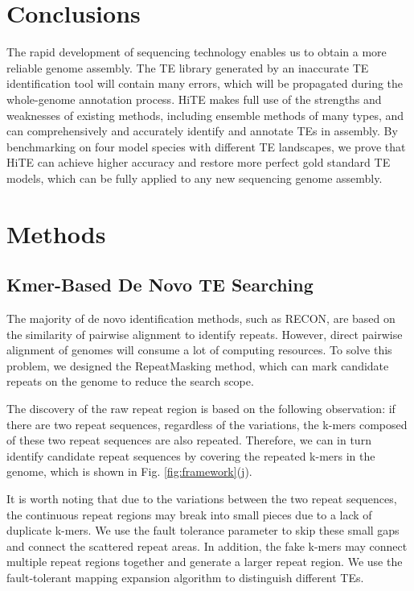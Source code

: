 \documentclass{bmcart}
\begin{document}
\section*{Conclusions}
The rapid development of sequencing technology enables us to obtain a more reliable genome assembly. The TE library generated by an inaccurate TE identification tool will contain many errors, which will be propagated during the whole-genome annotation process. HiTE makes full use of the strengths and weaknesses of existing methods, including ensemble methods of many types, and can comprehensively and accurately identify and annotate TEs in assembly. By benchmarking on four model species with different TE landscapes, we prove that HiTE can achieve higher accuracy and restore more perfect gold standard TE models, which can be fully applied to any new sequencing genome assembly.

\section*{Methods}

\subsection*{Kmer-Based De Novo TE Searching}
The majority of de novo identification methods, such as RECON, are based on the similarity of pairwise alignment to identify repeats. However, direct pairwise alignment of genomes will consume a lot of computing resources. To solve this problem, we designed the RepeatMasking method, which can mark candidate repeats on the genome to reduce the search scope.

The discovery of the raw repeat region is based on the following observation: if there are two repeat sequences, regardless of the variations, the k-mers composed of these two repeat sequences are also repeated. Therefore, we can in turn identify candidate repeat sequences by covering the repeated k-mers in the genome, which is shown in Fig. \ref{fig:framework}(j).

It is worth noting that due to the variations between the two repeat sequences, the continuous repeat regions may break into small pieces due to a lack of duplicate k-mers. We use the fault tolerance parameter to skip these small gaps and connect the scattered repeat areas. In addition, the fake k-mers may connect multiple repeat regions together and generate a larger repeat region. We use the fault-tolerant mapping expansion algorithm to distinguish different TEs.
\end{document}
